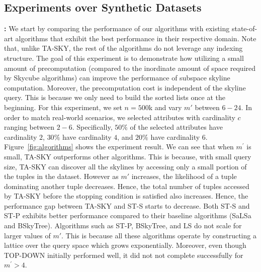 \subsection{Experiments over Synthetic Datasets}

\vspace{1mm}
 \textbf{:} We start by comparing the performance of our algorithms with existing state-of-art algorithms that exhibit the best performance in their respective domain. Note that, unlike TA-SKY, the rest of the algorithms do not leverage any indexing structure. The goal of this experiment is to demonstrate how utilizing a small amount of precomputation (compared to the inordinate amount of space required by Skycube algorithms) can improve the performance of subspace skyline computation. Moreover, the precomputation cost is independent of the skyline query. This is because we only need to build the sorted lists once at the beginning. For this experiment, we set $n=500$k and vary $m'$ between $6-24$. In order to match real-world scenarios, we selected attributes with cardinality $c$ ranging between $2-6$. Specifically, $50\%$ of the selected attributes have cardinality $2$, $30\%$ have cardinality $4$, and $20\%$ have cardinality $6$. Figure~\ref{fig:algorithms} shows the experiment result. We can see that when $m^\prime$ is small, TA-SKY outperforms other algorithms. This is because, with small query size, TA-SKY can discover all the skylines by accessing only a small portion of the tuples in the dataset. However as $m'$ increases, the likelihood of a tuple dominating another tuple decreases. Hence, the total number of tuples accessed by TA-SKY before the stopping condition is satisfied also increases. Hence, the performance gap between TA-SKY and ST-S starts to decrease. Both ST-S and ST-P exhibits better performance compared to their baseline algorithms (SaLSa and BSkyTree). Algorithms such as ST-P, BSkyTree, and LS do not scale for larger values of $m'$. This is because all these algorithms operate by constructing a lattice over the query space which grows exponentially. Moreover, even though TOP-DOWN initially performed well, it did not not complete successfully for $m^\prime > 4$.



